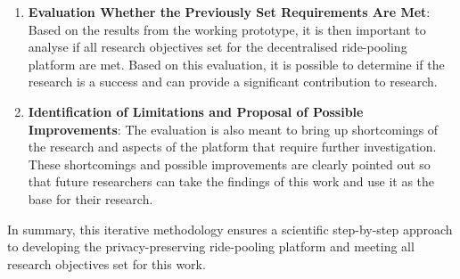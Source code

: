 \begin{enumerate}
    \item \textbf{Evaluation Whether the Previously Set Requirements Are Met}: 
    Based on the results from the working prototype, it is then important to analyse if all research objectives set for the decentralised ride-pooling platform are met. Based on this evaluation, it is possible to determine if the research is a success and can provide a significant contribution to research.

    \item \textbf{Identification of Limitations and Proposal of Possible Improvements}:
    The evaluation is also meant to bring up shortcomings of the research and aspects of the platform that require further investigation. These shortcomings and possible improvements are clearly pointed out so that future researchers can take the findings of this work and use it as the base for their research.

\end{enumerate}

In summary, this iterative methodology ensures a scientific step-by-step approach to developing the  privacy-preserving ride-pooling platform and meeting all research objectives set for this work.